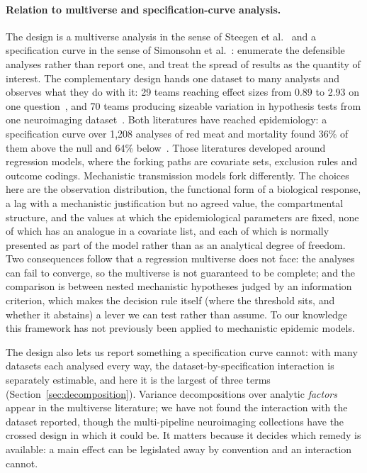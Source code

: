\documentclass[11pt,a4paper]{article}
\begin{document}
\paragraph{Relation to multiverse and specification-curve analysis.} The design
is a multiverse analysis in the sense of Steegen et al.~\cite{steegen} and a
specification curve in the sense of Simonsohn et al.~\cite{simonsohn}: enumerate
the defensible analyses rather than report one, and treat the spread of results
as the quantity of interest. The complementary design hands one dataset to many
analysts and observes what they do with it: 29 teams reaching effect sizes
from 0.89 to 2.93 on one question~\cite{silberzahn}, and 70 teams producing
sizeable variation in hypothesis tests from one neuroimaging
dataset~\cite{narps}. Both literatures have reached epidemiology: a
specification curve over 1{,}208 analyses of red meat and mortality found 36\%
of them above the null and 64\% below~\cite{speccurveepi}. Those literatures developed around regression
models, where the forking paths are covariate sets, exclusion rules and outcome
codings. Mechanistic transmission models fork differently. The choices here are
the observation distribution, the functional form of a biological response, a
lag with a mechanistic justification but no agreed value, the compartmental
structure, and the values at which the epidemiological parameters are fixed, none of which has an analogue in a covariate list, and each of which is normally
presented as part of the model rather than as an analytical degree of freedom. Two consequences follow that a regression multiverse does not
face: the analyses can fail to converge, so the multiverse is not guaranteed to
be complete; and the comparison is between nested mechanistic hypotheses judged
by an information criterion, which makes the decision rule itself (where the
threshold sits, and whether it abstains) a lever we can test rather than
assume. To our knowledge this framework has not previously been applied to
mechanistic epidemic models.

The design also lets us report something a specification curve cannot: with many
datasets each analysed every way, the dataset-by-specification interaction is
separately estimable, and here it is the largest of three terms
(Section~\ref{sec:decomposition}). Variance decompositions over analytic
\emph{factors} appear in the multiverse literature; we have not found the
interaction with the dataset reported, though the multi-pipeline neuroimaging
collections have the crossed design in which it could be. It matters because it
decides which remedy is available: a main effect can be legislated away by
convention and an interaction cannot.
\end{document}
